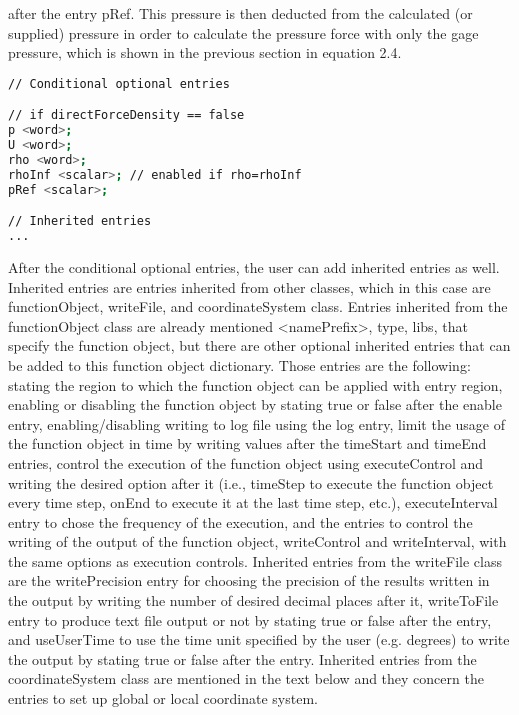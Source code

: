 after the entry pRef. This pressure is then deducted from the calculated (or supplied) pressure in order to calculate the pressure force with only the gage pressure, which is shown in the previous section in equation 2.4.

\begin{lstlisting}[language=sh, caption=Conditional optional entries for function object forces]
// Conditional optional entries

// if directForceDensity == false
p <word>;
U <word>;
rho <word>;
rhoInf <scalar>; // enabled if rho=rhoInf
pRef <scalar>;

// Inherited entries
...
\end{lstlisting}

After the conditional optional entries, the user can add inherited entries as well. Inherited entries are entries inherited from other classes, which in this case are functionObject, writeFile, and coordinateSystem class. Entries inherited from the functionObject class are already mentioned <namePrefix>, type, libs, that specify the function object, but there are other optional inherited entries that can be added to this function object dictionary. Those entries are the following: stating
the region to which the function object can be applied with entry region, enabling or disabling the function object by stating true or false after the enable entry, enabling/disabling writing to log file using the log entry, limit the usage of the function object in time by writing values after the timeStart and timeEnd entries, control the execution of the function object using executeControl and writing the desired option after it (i.e., timeStep to execute the function object every time
step, onEnd to execute it at the last time step, etc.), executeInterval entry to chose the frequency of the execution, and the entries to control the writing of the output of the function object, writeControl and writeInterval, with the same options as execution controls. Inherited entries from the writeFile class are the writePrecision entry for choosing the precision of the results written in the output by writing the number of desired decimal places after it, writeToFile entry
to produce text file output or not by stating true or false after the entry, and useUserTime to use the time unit specified by the user (e.g. degrees) to write the output by stating true or false after the entry. Inherited entries from the coordinateSystem class are mentioned in the text below and they concern the entries to set up global or local coordinate system.

